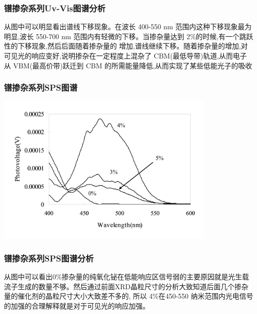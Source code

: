 \documentclass[xetex,compress]{mybeamer}
\begin{document}
\begin{frame}
\frametitle{镨掺杂系列Uv-Vis图谱分析}
\begin{block}{}
从图中可以明显看出谱线下移现象。在波长 400-550 nm 范围内这种下移现象最为明显,波长 550-700 nm 范围内有轻微的下移。当掺杂量达到 2\%的时候,有一个跳跃性的下移现象,然后后面随着掺杂量的
增加,谱线继续下移。随着掺杂量的增加,对可见光的响应变好,说明掺杂在一定程度上混杂了 CBM(最低导带)轨道,从而电子从 VBM(最高价带)跃迁到 CBM 的所需能量降低,从而实现了某些低能光子的吸收
\end{block}
\end{frame}

\begin{frame}
\frametitle{镨掺杂系列SPS图谱}
\begin{block}{}
\centering
\includegraphics[width=0.8\textwidth]{figures/镨掺杂SPS.jpg} 
\end{block}
\end{frame}

\begin{frame}
\frametitle{镨掺杂系列SPS图谱分析}
\begin{block}{}
从图中可以看出0\%掺杂量的纯氧化铋在低能响应区信号弱的主要原因就是光生载流子生成的数量不够。然后通过前面XRD晶粒尺寸的分析大致知道后面几个掺杂量的催化剂的晶粒尺寸大小大致差不多的,
所以 4\%在450-550 纳米范围内光电信号的加强的合理解释就是对于可见光的响应加强。
\end{block}
\end{frame}
\end{document}
